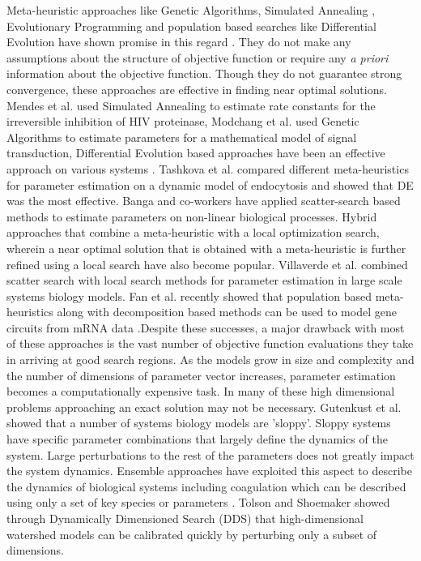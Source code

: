 \documentclass[12pt]{article}
\begin{document}
Meta-heuristic approaches like Genetic Algorithms, Simulated Annealing \cite{kirkpatrick1983optimization}, Evolutionary Programming and population based searches like Differential Evolution\cite{storn1997differential} have shown promise in this regard \cite{sun2012parameter}. They do not make any assumptions about the structure of objective function or require any \textit{a priori} information about the objective function. Though they do not guarantee strong convergence, these approaches are effective in finding near optimal solutions.  Mendes et al. \cite{mendes1998non} used Simulated Annealing to estimate rate constants for the irreversible inhibition of HIV proteinase, Modchang et al. \cite {modchang2008mathematical} used Genetic Algorithms to estimate parameters for a mathematical model of signal transduction, Differential Evolution based approaches have been an effective approach on various systems \cite{tsai2005evolutionary,wang2001hybrid,noman2007inferring}. Tashkova et al. \cite{tashkova2011parameter} compared different meta-heuristics for parameter estimation on a dynamic model of endocytosis and showed that DE was the most effective. Banga and co-workers have applied scatter-search based methods \cite{villaverde2012cooperative,rodriguez2006novel,egea2007scatter} to estimate parameters on non-linear biological processes. Hybrid approaches that combine a meta-heuristic with a local optimization search, wherein a near optimal solution that is obtained with a meta-heuristic is further refined using a local search have also become popular. Villaverde et al. \cite{villaverde2015biopredyn} combined scatter search with local search methods for parameter estimation in large scale systems biology models. Fan et al. recently showed that population based meta-heuristics along with decomposition based methods can be used to model gene circuits from mRNA data \cite{fan2015parameter}.Despite these successes, a  major drawback with most of these approaches is the vast number of objective function evaluations they take in arriving at good search regions. As the models grow in size and complexity and the number of dimensions of parameter vector increases,  parameter estimation becomes a computationally expensive task. In many of these high dimensional problems approaching an exact solution may not be necessary. Gutenkust et al. \cite{gutenkunst2007universally} showed that a number of systems biology models are 'sloppy'. Sloppy systems have specific parameter combinations that largely define the dynamics of the system. Large perturbations to the rest of the parameters does not greatly impact the system dynamics. Ensemble approaches \cite{song2010ensembles,luan2010ensembles} have exploited this aspect to describe the dynamics of biological systems including coagulation which can be described using only a set of key species or parameters \cite{sagar2015dynamic}. Tolson and Shoemaker \cite{tolson2007dynamically} showed through Dynamically Dimensioned Search (DDS) that high-dimensional watershed models can be calibrated quickly by perturbing only a subset of dimensions.
\end{document}
